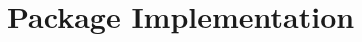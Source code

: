 \hypertarget{namespace_implementation}{}\section{Package Implementation}
\label{namespace_implementation}
